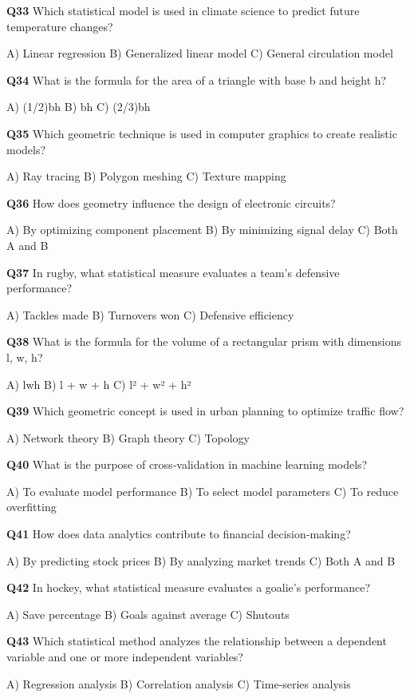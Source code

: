 \textbf{Q33} Which statistical model is used in climate science to predict future temperature changes?\par
    A) Linear regression  
    B) Generalized linear model  
    C) General circulation model

\textbf{Q34} What is the formula for the area of a triangle with base b and height h?\par
    A) (1/2)bh  
    B) bh  
    C) (2/3)bh

\textbf{Q35} Which geometric technique is used in computer graphics to create realistic models?\par
    A) Ray tracing  
    B) Polygon meshing  
    C) Texture mapping

\textbf{Q36} How does geometry influence the design of electronic circuits?\par
    A) By optimizing component placement  
    B) By minimizing signal delay  
    C) Both A and B

\textbf{Q37} In rugby, what statistical measure evaluates a team's defensive performance?\par
    A) Tackles made  
    B) Turnovers won  
    C) Defensive efficiency

\textbf{Q38} What is the formula for the volume of a rectangular prism with dimensions l, w, h?\par
    A) lwh  
    B) l + w + h  
    C) l² + w² + h²

\textbf{Q39} Which geometric concept is used in urban planning to optimize traffic flow?\par
    A) Network theory  
    B) Graph theory  
    C) Topology

\textbf{Q40} What is the purpose of cross‑validation in machine learning models?\par
    A) To evaluate model performance  
    B) To select model parameters  
    C) To reduce overfitting

\textbf{Q41} How does data analytics contribute to financial decision‑making?\par
    A) By predicting stock prices  
    B) By analyzing market trends  
    C) Both A and B

\textbf{Q42} In hockey, what statistical measure evaluates a goalie's performance?\par
    A) Save percentage  
    B) Goals against average  
    C) Shutouts

\textbf{Q43} Which statistical method analyzes the relationship between a dependent variable and one or more independent variables?\par
    A) Regression analysis  
    B) Correlation analysis  
    C) Time‑series analysis

